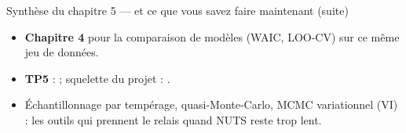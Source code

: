 \begin{frame}{Synthèse du chapitre 5 --- et ce que vous savez faire maintenant (suite)}
\begin{kbox}
\begin{itemize}
  \item \textbf{Chapitre 4} pour la comparaison de modèles (WAIC, LOO-CV) sur ce
        m\^eme jeu de données.
  \item \textbf{TP5} :  ;
        squelette du projet : .
  \item Échantillonnage par tempérage, quasi-Monte-Carlo, MCMC variationnel
        (VI) : les outils qui prennent le relais quand NUTS reste trop lent.
\end{itemize}
\end{kbox}
\end{frame}
